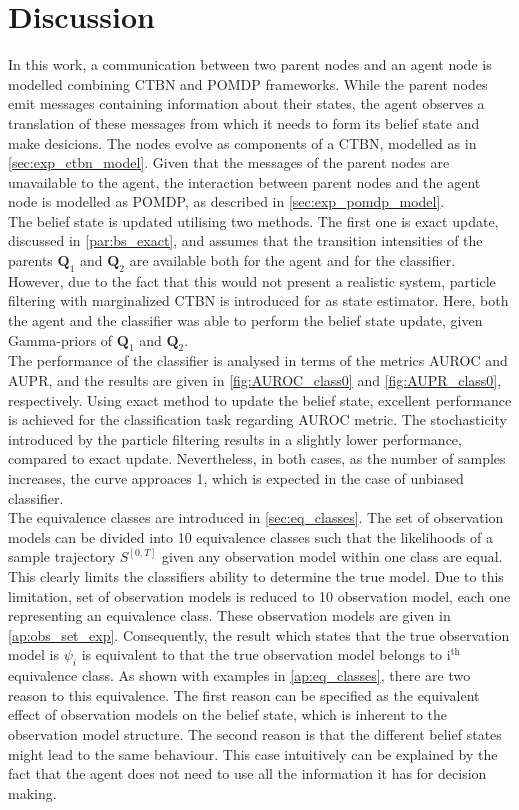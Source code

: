 \chapter{Discussion}
In this work, a communication between two parent nodes and an agent node is modelled combining CTBN and POMDP frameworks. While the parent nodes emit messages containing information about their states, the agent observes a translation of these messages from which it needs to form its belief state and make desicions. The nodes evolve as components of a CTBN, modelled as in \cref{sec:exp_ctbn_model}. Given that the messages of the parent nodes are unavailable to the agent, the interaction between parent nodes and the agent node is modelled as POMDP, as described in \cref{sec:exp_pomdp_model}.\\
The belief state is updated utilising two methods. The first one is exact update, discussed in \cref{par:bs_exact}, and assumes that the transition intensities of the parents $ \textbf{Q}_1 $ and $ \textbf{Q}_2 $ are available both for the agent and for the classifier. However, due to the fact that this would not present a realistic system, particle filtering with marginalized CTBN is introduced for as state estimator. Here, both the agent and the classifier was able to perform the belief state update, given Gamma-priors of $ \textbf{Q}_1 $ and $ \textbf{Q}_2 $.\\
The performance of the classifier is analysed in terms of the metrics AUROC and AUPR, and the results are given in \autoref{fig:AUROC_class0} and \autoref{fig:AUPR_class0}, respectively. Using exact method to update the belief state, excellent performance is achieved for the classification task regarding AUROC metric. The stochasticity introduced by the particle filtering results in a slightly lower performance, compared to exact update. Nevertheless, in both cases, as the number of samples increases, the curve approaces 1, which is expected in the case of unbiased classifier.\\
The equivalence classes are introduced in \cref{sec:eq_classes}. The set of observation models can be divided into 10 equivalence classes such that the likelihoods of a sample trajectory $ S^{[0,T]} $ given any observation model within one class are equal. This clearly limits the classifiers ability to determine the true model. Due to this limitation, set of observation models is reduced to 10 observation model, each one representing an equivalence class. These observation models are given in \cref{ap:obs_set_exp}. Consequently, the result which states that the true observation model is $ \psi_i $ is equivalent to that the true observation model belongs to $ \text{i}^{\text{th}} $ equivalence class. As shown with examples in \cref{ap:eq_classes}, there are two reason to this equivalence. The first reason can be specified as the equivalent effect of observation models on the belief state, which is inherent to the observation model structure. The second reason is that the different belief states might lead to the same behaviour. This case intuitively can be explained by the fact that the agent does not need to use all the information it has for decision making.\\

